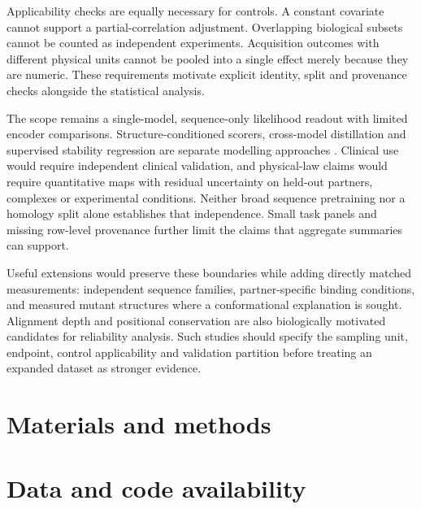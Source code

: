 \documentclass[12pt]{article}
\begin{document}
Applicability checks are equally necessary for controls. A constant covariate cannot support a partial-correlation adjustment. Overlapping biological subsets cannot be counted as independent experiments. Acquisition outcomes with different physical units cannot be pooled into a single effect merely because they are numeric. These requirements motivate explicit identity, split and provenance checks alongside the statistical analysis.

The scope remains a single-model, sequence-only likelihood readout with limited encoder comparisons. Structure-conditioned scorers, cross-model distillation and supervised stability regression are separate modelling approaches \citep{Su2024SaProt,Dinh2026VESM,Savojardo2025DDGemb}. Clinical use would require independent clinical validation, and physical-law claims would require quantitative maps with residual uncertainty on held-out partners, complexes or experimental conditions. Neither broad sequence pretraining nor a homology split alone establishes that independence. Small task panels and missing row-level provenance further limit the claims that aggregate summaries can support.

Useful extensions would preserve these boundaries while adding directly matched measurements: independent sequence families, partner-specific binding conditions, and measured mutant structures where a conformational explanation is sought. Alignment depth and positional conservation are also biologically motivated candidates for reliability analysis. Such studies should specify the sampling unit, endpoint, control applicability and validation partition before treating an expanded dataset as stronger evidence.

\section{Materials and methods}



\begingroup
{}
\section{Data and code availability}
\end{document}
